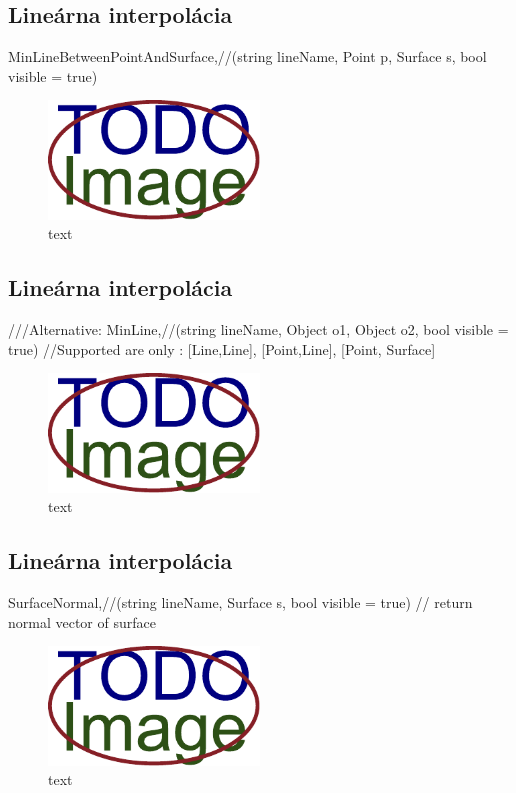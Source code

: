 \subsection{Lineárna interpolácia}
		MinLineBetweenPointAndSurface,//(string lineName, Point p, Surface s, bool visible = true)

\begin{figure}[H]
	\centering
	\includegraphics[width=0.5\textwidth]{obrazky-figures/placeholder.pdf}
	\caption{text}
	\label{fig:1}
\end{figure}


\subsection{Lineárna interpolácia}
		///Alternative:
		MinLine,//(string lineName, Object o1, Object o2, bool visible = true) //Supported are only : [Line,Line], [Point,Line], [Point, Surface]


\begin{figure}[H]
	\centering
	\includegraphics[width=0.5\textwidth]{obrazky-figures/placeholder.pdf}
	\caption{text}
	\label{fig:1}
\end{figure}



\subsection{Lineárna interpolácia}
		SurfaceNormal,//(string lineName, Surface s, bool visible = true) // return normal vector of surface


\begin{figure}[H]
	\centering
	\includegraphics[width=0.5\textwidth]{obrazky-figures/placeholder.pdf}
	\caption{text}
	\label{fig:1}
\end{figure}



